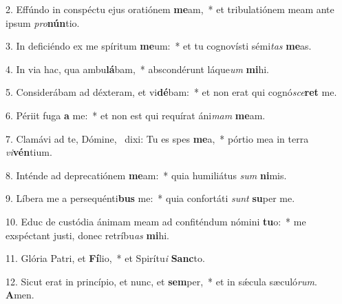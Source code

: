 2. Effúndo in conspéctu ejus oratiónem \textbf{me}am,~*  et tribulatiónem meam ante ipsum \textit{pro}\textbf{nún}tio.\

3. In deficiéndo ex me spíritum \textbf{me}um:~*  et tu cognovísti sémi\textit{tas} \textbf{me}as.\

4. In via hac, qua ambu\textbf{lá}bam,~*  abscondérunt láque\textit{um} \textbf{mi}hi.\

5. Considerábam ad déxteram, et vi\textbf{dé}bam:~*  et non erat qui cognó\textit{sce}\textbf{ret} me.\

6. Périit fuga \textbf{a} me:~*  et non est qui requírat áni\textit{mam} \textbf{me}am.\

7. Clamávi ad te, Dómine, \dag\  dixi: Tu es spes \textbf{me}a,~*  pórtio mea in terra \textit{vi}\textbf{vén}tium.\

8. Inténde ad deprecatiónem \textbf{me}am:~*  quia humiliátus \textit{sum} \textbf{ni}mis.\

9. Líbera me a persequénti\textbf{bus} me:~*  quia confortáti \textit{sunt} \textbf{su}per me.\

10. Educ de custódia ánimam meam ad confiténdum nómini \textbf{tu}o:~*  me exspéctant justi, donec retríbu\textit{as} \textbf{mi}hi.\

11. Glória Patri, et \textbf{Fí}lio,~*  et Spirítu\textit{i} \textbf{Sanc}to.\

12. Sicut erat in princípio, et nunc, et \textbf{sem}per,~*  et in sǽcula sæculó\textit{rum}. \textbf{A}men.\

